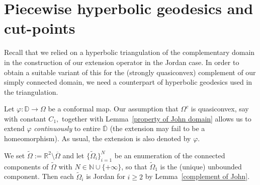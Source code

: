 \documentclass[reqno,11pt]{amsart}
\def\rr{{\mathbb R}}
\def\wz{\widetilde}
\numberwithin{equation}{section}
\theoremstyle{remark}
\begin{document}
\section{Piecewise hyperbolic geodesics and cut-points}\label{sec:phg}

Recall that we relied on a hyperbolic triangulation of the complementary domain
in the construction of our extension operator in the Jordan case. In order
to obtain a suitable variant of this for the (strongly quasiconvex)
complement of our simply connected domain, we need a counterpart of hyperbolic geodesics used in the triangulation. 



Let $\varphi \colon \mathbb D \to \Omega$ be a conformal map. Our assumption 
that $\Omega^c$ is quasiconvex, say with constant $C_1,$ together with
Lemma~\ref{property of John domain} 
allows us to extend $\varphi$ \emph{continuously}  to entire $\overline {\mathbb D}$  (the extension may fail to  be a homeomorphism).
As usual, the extension is also denoted by $\varphi.$ 


We set $\wz\Omega := \rr^2 \setminus \overline{\Omega}$ and 
let $\{\widetilde\Omega_i\}_{i=1}^N$ be an enumeration of the connected 
components of $\widetilde\Omega$ with $N\in \mathbb N \cup\{+\infty\}$, so 
that $\wz \Omega_1$ is the (unique) unbounded component. Then each 
$\widetilde\Omega_i$ is Jordan for $i\ge 2$ by Lemma~\ref{complement of John}.
\end{document}
